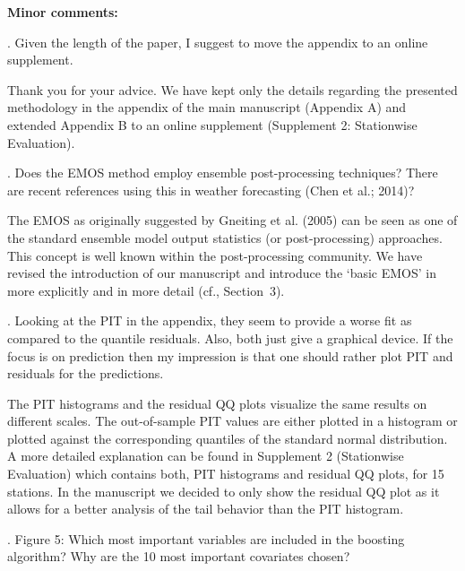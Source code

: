 \documentclass[american,foldmarks=false,noconfig]{uibklttr}
\newenvironment{review}{\fontshape{\itdefault}\fontseries{\bfdefault} \selectfont \smallskip}{\par}
\begin{document}
\bigskip

\textbf{Minor comments:}


\begin{review}
1. Given the length of the paper, I suggest to move the 
appendix to an online supplement.
\end{review}

Thank you for your advice. We have kept only the details regarding
the presented methodology in the appendix of the main manuscript
(Appendix A) and extended Appendix B to an online supplement
(Supplement 2: Stationwise Evaluation).

\begin{review}
2. Does the EMOS method employ ensemble post-processing 
techniques? There are recent references using this in weather 
forecasting (Chen et al.; 2014)?
\end{review}

The EMOS as originally suggested by Gneiting et al. (2005) can be seen
as one of the standard ensemble model output statistics (or post-processing)
approaches. This concept is well known within the post-processing community.
We have revised the introduction of our manuscript and introduce the `basic EMOS'
in more explicitly and in more detail (cf., Section~3).


\begin{review}
3. Looking at the PIT in the appendix, they seem to provide a 
worse fit as compared to the quantile residuals. Also, both 
just give a graphical device. If the focus is on prediction 
then my impression is that one should rather plot PIT and 
residuals for the predictions.
\end{review}

The PIT histograms and the residual QQ plots visualize the same
results on different scales. The out-of-sample PIT values are 
either plotted in a histogram or plotted against the corresponding
quantiles of the standard normal distribution. A more detailed 
explanation can be found in Supplement 2 (Stationwise Evaluation) 
which contains both, PIT histograms and residual QQ plots, 
for 15 stations. In the manuscript we decided to only show the 
residual QQ plot as it allows for a better analysis of the tail 
behavior than the PIT histogram.


\begin{review}
4. Figure 5: Which most important variables are included in the 
boosting algorithm? Why are the 10 most important covariates chosen?
\end{review}
\end{document}
